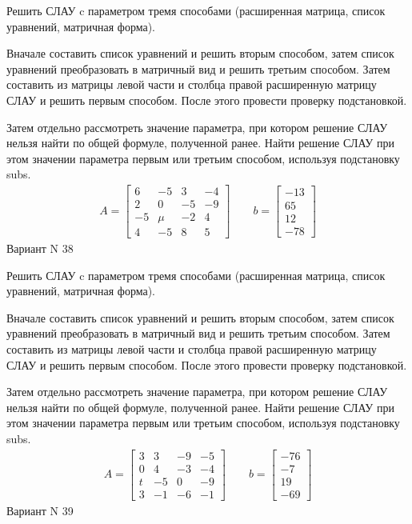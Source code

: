 \documentclass[11pt]{report}
\begin{document}
Решить СЛАУ c параметром тремя способами (расширенная матрица, список уравнений, матричная форма).

Вначале составить список уравнений и решить вторым способом,
затем список уравнений преобразовать в матричный вид и решить третьим способом.
Затем составить из матрицы левой части и столбца правой расширенную матрицу СЛАУ и решить первым способом.
После этого провести проверку подстановкой.

Затем отдельно рассмотреть значение параметра, при котором решение СЛАУ нельзя найти по общей формуле,
полученной ранее.
Найти решение СЛАУ при этом значении параметра первым или третьим способом, используя подстановку subs.
\begin{align*}
    A = \left[\begin{matrix}6 & -5 & 3 & -4\\2 & 0 & -5 & -9\\-5 & \mu & -2 & 4\\4 & -5 & 8 & 5\end{matrix}\right]
\qquad b = \left[\begin{matrix}-13\\65\\12\\-78\end{matrix}\right]
\end{align*}
\newpage
Вариант N 38


Решить СЛАУ c параметром тремя способами (расширенная матрица, список уравнений, матричная форма).

Вначале составить список уравнений и решить вторым способом,
затем список уравнений преобразовать в матричный вид и решить третьим способом.
Затем составить из матрицы левой части и столбца правой расширенную матрицу СЛАУ и решить первым способом.
После этого провести проверку подстановкой.

Затем отдельно рассмотреть значение параметра, при котором решение СЛАУ нельзя найти по общей формуле,
полученной ранее.
Найти решение СЛАУ при этом значении параметра первым или третьим способом, используя подстановку subs.
\begin{align*}
    A = \left[\begin{matrix}3 & 3 & -9 & -5\\0 & 4 & -3 & -4\\t & -5 & 0 & -9\\3 & -1 & -6 & -1\end{matrix}\right]
\qquad b = \left[\begin{matrix}-76\\-7\\19\\-69\end{matrix}\right]
\end{align*}
\newpage
Вариант N 39
\end{document}
